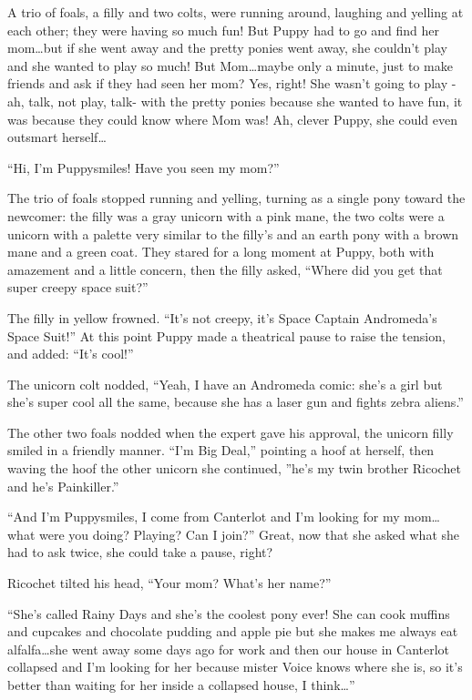 A trio of foals, a filly and two colts, were running around, laughing and yelling at each other; they were having so much fun! But Puppy had to go and find her mom\dots but if she went away and the pretty ponies went away, she couldn't play and she wanted to play so much! But Mom\dots maybe only a minute, just to make friends and ask if they had seen her mom? Yes, right! She wasn't going to play -ah, talk, not play, talk- with the pretty ponies because she wanted to have fun, it was because they could know where Mom was! Ah, clever Puppy, she could even outsmart herself\dots

``Hi, I'm Puppysmiles! Have you seen my mom?''

The trio of foals stopped running and yelling, turning as a single pony toward the newcomer: the filly was a gray unicorn with a pink mane, the two colts were a unicorn with a palette very similar to the filly's and an earth pony with a brown mane and a green coat. They stared for a long moment at Puppy, both with amazement and a little concern, then the filly asked, ``Where did you get that super creepy space suit?''

The filly in yellow frowned. ``It's not creepy, it's Space Captain Andromeda's Space Suit!'' At this point Puppy made a theatrical pause to raise the tension, and added: ``It's cool!''

The unicorn colt nodded, ``Yeah, I have an Andromeda comic: she's a girl but she's super cool all the same, because she has a laser gun and fights zebra aliens.''

The other two foals nodded when the expert gave his approval, the unicorn filly smiled in a friendly manner. ``I'm Big Deal,'' pointing a hoof at herself, then waving the hoof the other unicorn she continued, ''he's my twin brother Ricochet and he's Painkiller.''

``And I'm Puppysmiles, I come from Canterlot and I'm looking for my mom\dots what were you doing? Playing? Can I join?'' Great, now that she asked what she had to ask twice, she could take a pause, right?

Ricochet tilted his head, ``Your mom? What's her name?''

``She's called Rainy Days and she's the coolest pony ever! She can cook muffins and cupcakes and chocolate pudding and apple pie but she makes me always eat alfalfa\dots she went away some days ago for work and then our house in Canterlot collapsed and I'm looking for her because mister Voice knows where she is, so it's better than waiting for her inside a collapsed house, I think\dots''

